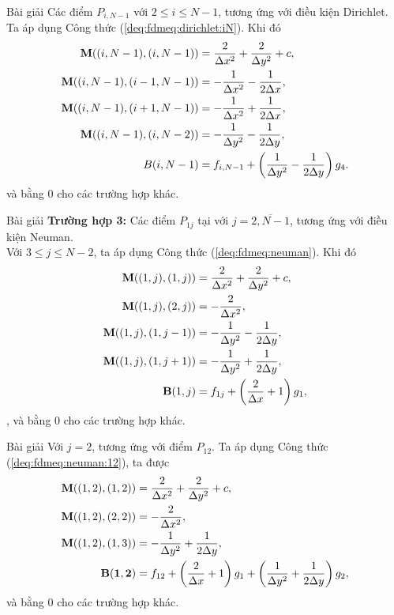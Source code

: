 \documentclass[9pt]{beamer}
\numberwithin{equation}{section}
\begin{document}
\begin{frame}
\begin{exampleblock}{Bài giải}
    Các điểm $P_{i,N-1}$ với $2 \le i \le N-1$, tương ứng với điều kiện Dirichlet. Ta áp dụng Công thức (\ref{deq:fdmeq:dirichlet:iN}). Khi đó
    \begin{align*}
        {\bf M}((i,N-1),(i,N-1)) &= \frac{2}{\Delta x^2} + \frac{2}{\Delta y^2} + c, \\
        {\bf M}((i,N-1),(i-1,N-1)) &= -\frac{1}{\Delta x^2} - \frac{1}{2\Delta x}, \\
        {\bf M}((i,N-1),(i+1,N-1)) &= -\frac{1}{\Delta x^2} + \frac{1}{2\Delta x}, \\
        {\bf M}((i,N-1),(i,N-2)) &= -\frac{1}{\Delta y^2} - \frac{1}{2\Delta y}, \\
        B(i,N-1) &= f_{i,N-1} + \left(\frac{1}{\Delta y^2} - \frac{1}{2\Delta y}\right) g_4.
    \end{align*}
    và bằng 0 cho các trường hợp khác.
\end{exampleblock}
\end{frame}

\begin{frame}
\begin{exampleblock}{Bài giải}
    \textbf{Trường hợp 3:} Các điểm $P_{1j}$ tại với $j = \overline{2,N-1}$, tương ứng với điều kiện Neuman. \\
    Với $3 \le j \le N-2$, ta áp dụng Công thức (\ref{deq:fdmeq:neuman}). Khi đó
    \begin{align*}
        {\bf M}((1,j),(1,j)) &= \frac{2}{\Delta x^2} + \frac{2}{\Delta y^2} + c, \\
        {\bf M}((1,j),(2,j)) &= -\frac{2}{\Delta x^2}, \\
        {\bf M}((1,j),(1,j-1)) &= -\frac{1}{\Delta y^2} - \frac{1}{2 \Delta y}, \\
        {\bf M}((1,j),(1,j+1)) &= -\frac{1}{\Delta y^2} + \frac{1}{2\Delta y}, \\
        {\bf B}(1,j) &= f_{1j} + \left(\frac{2}{\Delta x} + 1\right) g_1,
    \end{align*},
    và bằng 0 cho các trường hợp khác.
\end{exampleblock}
\end{frame}

\begin{frame}
\begin{exampleblock}{Bài giải}
    Với $j = 2$, tương ứng với điểm $P_{12}$. Ta áp dụng Công thức (\ref{deq:fdmeq:neuman:12}), ta được
    \begin{align*}
        {\bf M}((1,2),(1,2)) &= \frac{2}{\Delta x^2} + \frac{2}{\Delta y^2} + c, \\
        {\bf M}((1,2),(2,2)) &= -\frac{2}{\Delta x^2}, \\
        {\bf M}((1,2),(1,3)) &= -\frac{1}{\Delta y^2} + \frac{1}{2\Delta y}, \\
        {\bf B(1,2)} &= f_{12} + \left(\frac{2}{\Delta x} + 1\right) g_1 + \left(\frac{1}{\Delta y^2} + \frac{1}{2\Delta y}\right) g_2,
    \end{align*}
    và bằng 0 cho các trường hợp khác.
\end{exampleblock}
\end{frame}
\end{document}
